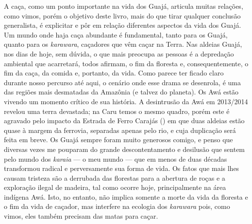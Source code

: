 A caça, como um ponto importante na vida dos Guajá, articula muitas
relações, como vimos, porém o objetivo deste livro, mais do que tirar
qualquer conclusão generalista, é explicitar e pôr
em relação diferentes aspectos da vida dos Guajá. Um mundo onde haja
caça abundante é fundamental, tanto para os Guajá, quanto para os
\emph{karawara}, caçadores que vêm caçar na Terra. Nas aldeias Guajá,
nos dias de hoje, sem dúvida, o que mais preocupa as pessoas é a
depredação ambiental que acarretará, todos afirmam, o fim da floresta e,
consequentemente, o fim da caça, da comida e, portanto, da vida. Como
parece ter ficado claro durante nosso percurso até aqui, o cenário onde
esse drama se desenrola, é uma das regiões mais desmatadas da Amazônia
(e talvez do planeta). Os Awá estão vivendo um momento crítico de sua
história. A desintrusão da  Awá em 2013/2014 revelou uma terra
devastada; na  Caru temos o mesmo quadro, porém este é agravado pelo
impacto da Estrada de Ferro Carajás () em que duas aldeias estão
quase à margem da ferrovia, separadas apenas pelo rio, e cuja duplicação
será feita em breve. Os Guajá sempre foram muito generosos comigo, e
penso que diversas vezes me pouparam do grande descontentamento e
desilusão que sentem pelo mundo dos \emph{karaia} --- o meu mundo --- que em
menos de duas décadas transformou radical e perversamente sua forma de
vida. Os fatos que mais lhes causam tristeza são a derrubada das
florestas para a abertura de roças e a exploração ilegal de madeira, tal
como ocorre hoje, principalmente na área indígena Awá. Isto, no entanto,
não implica somente a morte da vida da floresta e o fim da vida de
caçador, mas interfere na ecologia dos \emph{karawara} pois, como vimos,
eles também precisam das matas para caçar.

